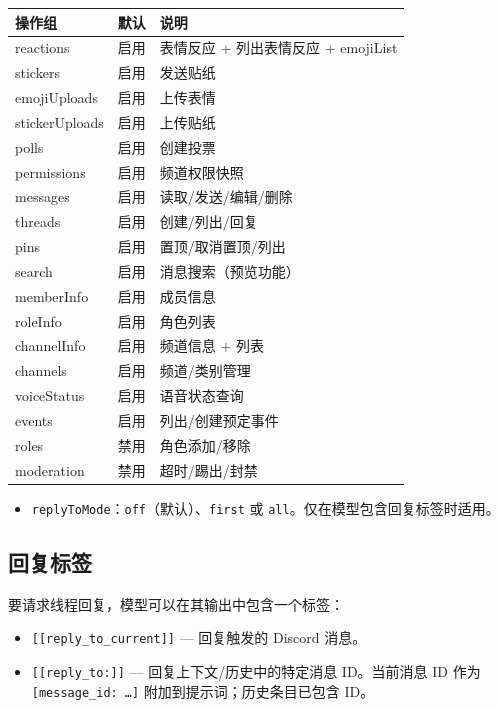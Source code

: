 \begin{table}[h]
\centering
\small
\begin{tabular}{|l|l|l|}
\hline
操作组 & 默认 & 说明 \\
\hline
reactions & 启用 & 表情反应 + 列出表情反应 + emojiList \\
\hline
stickers & 启用 & 发送贴纸 \\
\hline
emojiUploads & 启用 & 上传表情 \\
\hline
stickerUploads & 启用 & 上传贴纸 \\
\hline
polls & 启用 & 创建投票 \\
\hline
permissions & 启用 & 频道权限快照 \\
\hline
messages & 启用 & 读取/发送/编辑/删除 \\
\hline
threads & 启用 & 创建/列出/回复 \\
\hline
pins & 启用 & 置顶/取消置顶/列出 \\
\hline
search & 启用 & 消息搜索（预览功能） \\
\hline
memberInfo & 启用 & 成员信息 \\
\hline
roleInfo & 启用 & 角色列表 \\
\hline
channelInfo & 启用 & 频道信息 + 列表 \\
\hline
channels & 启用 & 频道/类别管理 \\
\hline
voiceStatus & 启用 & 语音状态查询 \\
\hline
events & 启用 & 列出/创建预定事件 \\
\hline
roles & 禁用 & 角色添加/移除 \\
\hline
moderation & 禁用 & 超时/踢出/封禁 \\
\hline
\end{tabular}
\end{table}



\begin{itemize}
  \item \texttt{replyToMode}：\texttt{off}（默认）、\texttt{first} 或 \texttt{all}。仅在模型包含回复标签时适用。
\end{itemize}


\subsection{回复标签}


要请求线程回复，模型可以在其输出中包含一个标签：

\begin{itemize}
  \item \texttt{[[reply\_to\_current]]} — 回复触发的 Discord 消息。
  \item \texttt{[[reply\_to:]]} — 回复上下文/历史中的特定消息 ID。当前消息 ID 作为 \texttt{[message\_id: …]} 附加到提示词；历史条目已包含 ID。
\end{itemize}


